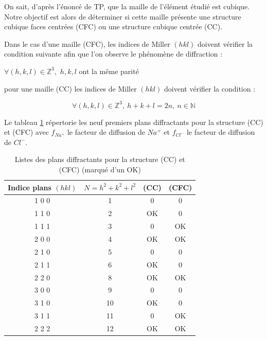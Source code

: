 \begin{flushleft}
	On sait, d'après l'énoncé de  TP, que la maille de l'élément étudié est cubique. Notre objectif est alors de déterminer si cette maille présente une structure cubique faces centrées (CFC) ou une structure cubique centrée (CC).
	
	
	Dans le cas d’une maille (CFC), les indices de Miller $(h k l)$ doivent vérifier la condition
	suivante afin que l’on observe le phénomène de diffraction : 
	\begin{center} 
		$\forall (h,k,l)\in \mathbb{Z}^3,$  $h,k,l$ ont la même parité 
	\end{center}
	
	pour une  maille (CC) les indices de Miller $(h k l)$ doivent vérifier la condition : 
	
	\begin{equation}
		\forall (h,k,l)\in \mathbb{Z}^3, \ 	h + k + l = 2n, \ n \in \mathbb{N}
	\end{equation}


\newpage
Le tableau \ref{tab:Listes des plans diffractants pour la structure (CC) et (CFC) (marqué d’un "OK")} répertorie les neuf premiers plans diffractants pour la structure (CC) et (CFC) avec $f_{Na^+}$ le facteur de diffusion de $Na^+$ et $f_{Cl^-}$ le facteur de diffusion de $Cl^-$.
\begin{table}[h!]
	\centering
	\begin{tabular}{|c|c|c|c|}
		\hline
		\textbf{Indice plans $(h k l)$} & \textbf{$N=h^2+k^2+l^2$} & \textbf{(CC)} & \textbf{(CFC)} \\
		\hline
		1 0 0 & 1 & 0 & 0 \\
		\hline
		1 1 0 & 2 & \textcolor{myred}{OK }& 0 \\
		\hline
		1 1 1 & 3 & 0 & \textcolor{myred}{OK } \\
		\hline
		2 0 0 & 4 & \textcolor{myred}{OK } & \textcolor{myred}{OK } \\
		\hline
		2 1 0 & 5 & 0 & 0 \\
		\hline
		2 1 1 & 6 & \textcolor{myred}{OK } & 0 \\
		\hline
		2 2 0 & 8 & \textcolor{myred}{OK } & \textcolor{myred}{OK } \\
		\hline
		3 0 0 & 9 & 0 & 0 \\
		\hline
		3 1 0 & 10 & \textcolor{myred}{OK } & 0 \\
		\hline
		3 1 1 & 11 & 0 & \textcolor{myred}{OK } \\
		\hline
		2 2 2 & 12 & \textcolor{myred}{OK } & \textcolor{myred}{OK } \\
		\hline
	\end{tabular}
	\caption{Listes des plans diffractants pour la structure (CC) et (CFC) (marqué d’un \textcolor{myred}{OK})}
	\label{tab:Listes des plans diffractants pour la structure (CC) et (CFC) (marqué d’un "OK")}
\end{table}



\end{flushleft}

